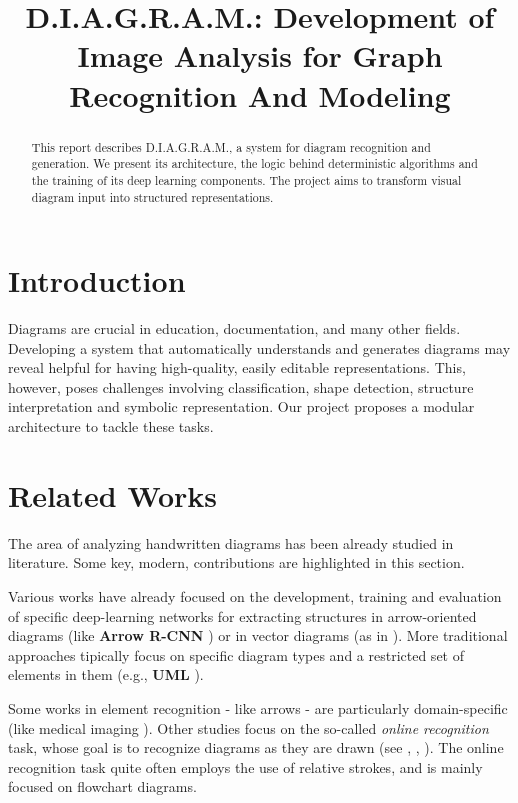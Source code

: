 \documentclass[conference]{IEEEtran}
\title{D.I.A.G.R.A.M.: Development of Image Analysis for Graph Recognition And Modeling}
\author{
    \IEEEauthorblockN{Filippo Garagnani, Saverio Napolitano, Nicola Ricciardi}
    \IEEEauthorblockA{
        'Computer Vision and Cognitive System' course \\
        \textit{Università di Modena e Reggio Emilia}
    }
}
\begin{document}
\maketitle

\begin{abstract}
This report describes D.I.A.G.R.A.M., a system for diagram recognition and generation. We present its architecture, the logic behind deterministic algorithms and the training of its deep learning components. The project aims to transform visual diagram input into structured representations.
\end{abstract}

\section{Introduction}
Diagrams are crucial in education, documentation, and many other fields. Developing a system that automatically understands and generates diagrams may reveal helpful for having high-quality, easily editable representations. This, however, poses challenges involving classification, shape detection, structure interpretation and symbolic representation. Our project proposes a modular architecture to tackle these tasks.

\section{Related Works}
The area of analyzing handwritten diagrams has been already studied in literature. Some key, modern, contributions are highlighted in this section.

Various works have already focused on the development, training and evaluation of specific deep-learning networks for extracting structures in arrow-oriented diagrams (like \textbf{Arrow R-CNN} \cite{arrowrcnn}) or in vector diagrams (as in \cite{sketchdiagram}). More traditional approaches tipically focus on specific diagram types and a restricted set of elements in them (e.g., \textbf{UML} \cite{interactiveUML}). 

Some works in element recognition - like arrows - are particularly domain-specific (like medical imaging \cite{med1}\cite{med2}). Other studies focus on the so-called \textit{online recognition} task, whose goal is to recognize diagrams as they are drawn (see \cite{online1}, \cite{online2}, \cite{online3}). The online recognition task quite often employs the use of relative strokes, and is mainly focused on flowchart diagrams.
\end{document}
